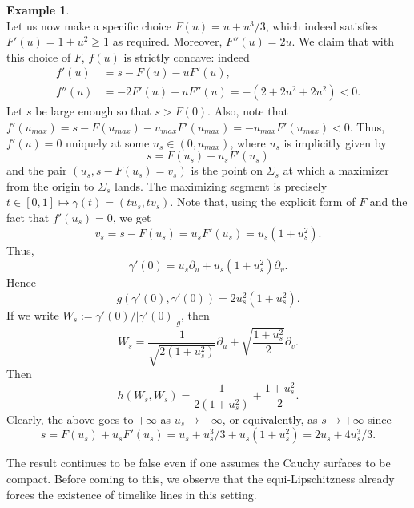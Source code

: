 \documentclass[a4paper,11pt]{article}
\numberwithin{equation}{section}
\theoremstyle{definition}
\newtheorem{Example}[Definition]{Example}
\theoremstyle{plain}
\begin{document}
\begin{Example}
\begin{equation}
\end{equation}
Let us now make a specific choice $F(u) = u + u^3/3$, which indeed satisfies $F'(u) = 1 + u^2 \geq 1$ as required. Moreover, $F''(u) = 2u$. We claim that with this choice of $F$, $f(u)$ is strictly concave: indeed
\begin{align}
    f'(u) &= s - F(u) - u F'(u),\\
    f''(u) &= - 2 F'(u) -  u F''(u) = -  (2 + 2u^2 + 2u^2) < 0.
\end{align}
Let $s$ be large enough so that $s > F(0)$. Also, note that $f'(u_{max}) = s - F(u_{max}) -  u_{max} F'(u_{max}) = - u_{max} F'(u_{max}) < 0.$ Thus, $f'(u) = 0$ uniquely at some $u_s \in (0,u_{max})$, where $u_s$ is implicitly given by
\begin{equation}
    s = F(u_s) + u_sF'(u_s)
\end{equation}
and the pair $(u_s, s - F(u_s) = v_s)$ is the point on $\Sigma_s$ at which a maximizer from the origin to $\Sigma_s$ lands. The maximizing segment is precisely $ t \in [0,1] \mapsto \gamma(t) = (tu_s,tv_s)$. Note that, using the explicit form of $F$ and the fact that $f'(u_s) = 0$, we get
\begin{equation}
    v_s = s - F(u_s) = u_s F'(u_s) = u_s (1+ u_s^2).
\end{equation}
Thus,
\begin{equation}
    \gamma'(0) = u_s \partial_u + u_s (1 + u_s^2) \partial_v.
\end{equation}
Hence
\begin{equation}
    g(\gamma'(0),\gamma'(0)) = 2u_s^2 (1 + u_s^2).
\end{equation}
If we write $W_s:= \gamma'(0)/|\gamma'(0)|_g$, then
\begin{equation}
    W_s = \frac{1}{\sqrt{2(1+u_s^2)}} \partial_u + \sqrt{\frac{1 + u_s^2}{2}} \partial_v.
\end{equation}
Then
\begin{equation}
    h(W_s,W_s) = \frac{1}{2 (1 + u_s^2)} + \frac{1 + u_s^2}{2}.
\end{equation}
Clearly, the above goes to $+\infty$ as $u_s \to +\infty$, or equivalently, as  $s \to +\infty$ since
\begin{equation}
    s = F(u_s) + u_s F'(u_s) =  u_s + u_s^3/3 + u_s(1 + u_s^2) = 2 u_s +  4 u_s^3/3.
\end{equation}
\end{Example}

The result continues to be false even if one assumes the Cauchy surfaces to be compact. Before coming to this, we observe that the equi-Lipschitzness already forces the existence of timelike lines in this setting.
\end{document}
